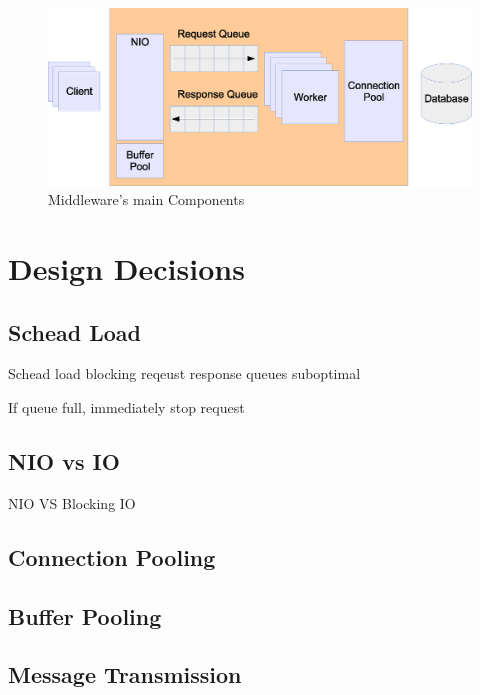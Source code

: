 \documentclass{article}
\begin{document}
\begin{figure}
	\begin{center}
    \includegraphics[scale=0.4]{../drawings/broker-threading.eps}
  \end{center}
  \caption{Middleware's main Components}
  \label{fig:middleware-threading}
\end{figure}

\section{Design Decisions}

\subsection{Schead Load}
Schead load
blocking reqeust response queues suboptimal

If queue full, immediately stop request

\subsection{NIO vs IO}

NIO VS Blocking IO

\subsection{Connection Pooling}

\subsection{Buffer Pooling}


\subsection{Message Transmission}


\end{document}
